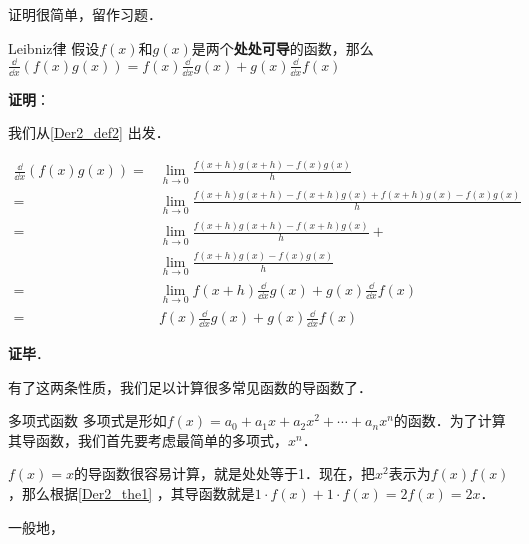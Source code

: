 证明很简单，留作习题．

\begin{theorem}{Leibniz律}\label{Der2_the1}
假设$f(x)$和$g(x)$是两个\textbf{处处可导}的函数，那么$\frac{\dd}{\dd x}(f(x)g(x))=f(x)\frac{\dd}{\dd x}g(x)+g(x)\frac{\dd}{\dd x}f(x)$
\end{theorem}

\textbf{证明}：

我们从\autoref{Der2_def2} 出发．

\begin{equation}
\begin{aligned}
\frac{\dd}{\dd x}(f(x)g(x))=&\lim\limits_{h\to 0}\frac{f(x+h)g(x+h)-f(x)g(x)}{h}\\
=&\lim\limits_{h\to 0}\frac{f(x+h)g(x+h)-f(x+h)g(x)+f(x+h)g(x)-f(x)g(x)}{h}\\
=&\lim\limits_{h\to 0}\frac{f(x+h)g(x+h)-f(x+h)g(x)}{h}+\\&\lim\limits_{h\to 0}\frac{f(x+h)g(x)-f(x)g(x)}{h}\\
=&\lim\limits_{h\to 0}f(x+h)\frac{\dd}{\dd x}g(x)+g(x)\frac{\dd}{\dd x}f(x)\\
=&f(x)\frac{\dd}{\dd x}g(x)+g(x)\frac{\dd}{\dd x}f(x)
\end{aligned}
\end{equation}

\textbf{证毕}．

有了这两条性质，我们足以计算很多常见函数的导函数了．

\begin{example}{多项式函数}
多项式是形如$f(x)=a_0+a_1x+a_2x^2+\cdots+a_nx^n$的函数．为了计算其导函数，我们首先要考虑最简单的多项式，$x^n$．

$f(x)=x$的导函数很容易计算，就是处处等于1．现在，把$x^2$表示为$f(x)f(x)$，那么根据\autoref{Der2_the1} ，其导函数就是$1\cdot f(x)+1\cdot f(x)=2f(x)=2x$．

一般地，
\end{example}
















